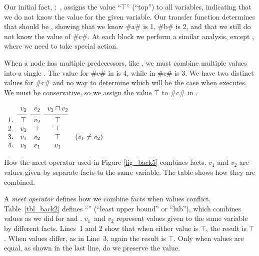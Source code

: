 \documentclass[12pt]{report}
\begin{document}
Our initial fact, :~, assigns the value ``$\top$'' (``top'') to all variables,
indicating that we do not know the value for the given variable. Our
transfer function determines that  should be
, showing that we know #a# is 1, #b# is 2, and
that we still do not know the value of #c#. At each block we perform a
similar analysis, except , where we need to
  take special action.

When a node has multiple predecessors, like ,
we must combine multiple \outBa values into a single \inBa. The value
for #c# in  is 4, while in 
#c# is 3. We have two distinct values for #c# and no way to determine
which will be the case when  executes. We
must be conservative, so we assign the value $\top$ to #c# in
.

\begin{table}[tbh]
  \centering
  \figbegin
  \begin{math}
    \begin{array}{ccccc}
      & v_1 & v_2 & v_1 \lub v_2 \\
      \cmidrule(r){2-2}\cmidrule(r){3-3}\cmidrule(r){4-4}
      1. & \top & v_2 & \top & \\ 
      2. & v_1 & \top & \top & \\
      3. & v_1 & v_2 & \top & \text{($v_1 \neq v_2$)}\\
      4. & v_1 & v_1 & v_1 
    \end{array}
  \end{math}
  \caption{How the meet operator used in
    Figure \ref{fig_back5} combines facts. $v_1$ and $v_2$ are
    values given by separate \outBa facts to the same variable. The
    table shows how they are combined.}
  \label{tbl_back2}
  \figend
\end{table}

A \emph{meet operator} defines how we combine facts when values
conflict. Table~\ref{tbl_back2} defines ``\lub'' (``least upper
bound'' or ``lub''), which combines values as we did for
 and . $v_1$~and $v_2$
represent values given to the same variable by different
facts. Lines~1 and 2 show that when either value is $\top$, the result
is $\top$. When values differ, as in Line~3, again the result is
$\top$. Only when values are equal, as shown in the last line, do we
preserve the value.
\end{document}
